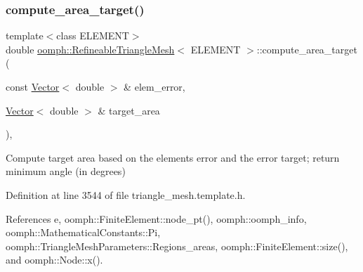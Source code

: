 \subsubsection{\texorpdfstring{compute\+\_\+area\+\_\+target()}{compute\_area\_target()}}
{\footnotesize\ttfamily template$<$class E\+L\+E\+M\+E\+NT$>$ \\
double \hyperlink{classoomph_1_1RefineableTriangleMesh}{oomph\+::\+Refineable\+Triangle\+Mesh}$<$ E\+L\+E\+M\+E\+NT $>$\+::compute\+\_\+area\+\_\+target (\begin{DoxyParamCaption}\item[{const \hyperlink{classoomph_1_1Vector}{Vector}$<$ double $>$ \&}]{elem\+\_\+error,  }\item[{\hyperlink{classoomph_1_1Vector}{Vector}$<$ double $>$ \&}]{target\+\_\+area }\end{DoxyParamCaption})\hspace{0.3cm}{\ttfamily [inline]}, {\ttfamily [protected]}}



Compute target area based on the element\textquotesingle{}s error and the error target; return minimum angle (in degrees) 



Definition at line 3544 of file triangle\+\_\+mesh.\+template.\+h.



References e, oomph\+::\+Finite\+Element\+::node\+\_\+pt(), oomph\+::oomph\+\_\+info, oomph\+::\+Mathematical\+Constants\+::\+Pi, oomph\+::\+Triangle\+Mesh\+Parameters\+::\+Regions\+\_\+areas, oomph\+::\+Finite\+Element\+::size(), and oomph\+::\+Node\+::x().

\mbox{\label{classoomph_1_1RefineableTriangleMesh_a6f98720e48868896fd4360ee10ebdd09}} 
